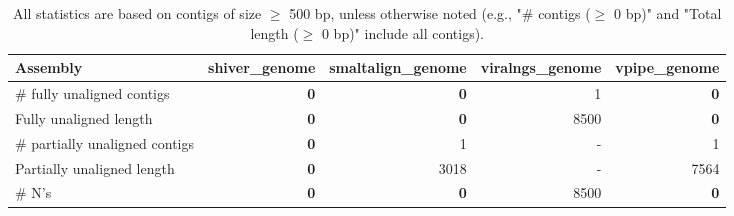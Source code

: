 \documentclass[12pt,a4paper]{article}
\begin{document}
\begin{table}[ht]
\begin{center}
\caption{All statistics are based on contigs of size $\geq$ 500 bp, unless otherwise noted (e.g., "\# contigs ($\geq$ 0 bp)" and "Total length ($\geq$ 0 bp)" include all contigs).}
\begin{tabular}{|l*{4}{|r}|}
\hline
Assembly & shiver\_genome & smaltalign\_genome & viralngs\_genome & vpipe\_genome \\ \hline
\# fully unaligned contigs & {\bf 0} & {\bf 0} & 1 & {\bf 0} \\ \hline
Fully unaligned length & {\bf 0} & {\bf 0} & 8500 & {\bf 0} \\ \hline
\# partially unaligned contigs & {\bf 0} & 1 & - & 1 \\ \hline
Partially unaligned length & {\bf 0} & 3018 & - & 7564 \\ \hline
\# N's & {\bf 0} & {\bf 0} & 8500 & {\bf 0} \\ \hline
\end{tabular}
\end{center}
\end{table}
\end{document}
